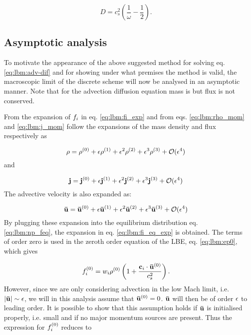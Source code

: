 \begin{equation}\label{eq:lbm:np_D}
D = c_s^2 \left( \frac{1}{\omega} - \frac{1}{2} \right).
\end{equation}

\subsection{Asymptotic analysis}\label{sec:lbm:asym_np}
To motivate the appearance of the above suggested method for solving
eq. \eqref{eq:lbm:adv-dif} and for showing under what premises the
method is valid, the macroscopic limit of the discrete scheme will now
be analysed in an asymptotic manner. Note that for the advection
diffusion equation mass is but flux is not conserved.

From the expansion of $f_i$ in eq. \eqref{eq:lbm:fi_exp} and from
eqs. \eqref{eq:lbm:rho_mom} and \eqref{eq:lbm:j_mom} follow the
expansions of the mass density and flux respectively as

\begin{equation}\label{eq:lbm:rho_exp}
\rho = \rho^{(0)} + \epsilon\rho^{(1)} + \epsilon^2\rho^{(2)} + \epsilon^3\rho^{(3)} + \mathcal{O}(\epsilon^4)
\end{equation} 
and

\begin{equation}
\mathbf{j} = \mathbf{j}^{(0)} + \epsilon\mathbf{j}^{(1)} + \epsilon^2\mathbf{j}^{(2)} + \epsilon^3\mathbf{j}^{(3)} + \mathcal{O}(\epsilon^4)
\end{equation} 
The advective velocity is also expanded as: 

\begin{equation}
\mathbf{\bar{u}} = \mathbf{\bar{u}}^{(0)} + \epsilon\mathbf{\bar{u}}^{(1)} + \epsilon^2\mathbf{\bar{u}}^{(2)} + \epsilon^3\mathbf{\bar{u}}^{(3)} + \mathcal{O}(\epsilon^4)
\end{equation}
By plugging these expansion into the equilibrium distribution
eq. \eqref{eq:lbm:np_feq}, the expansion in
eq. \eqref{eq:lbm:fi_eq_exp} is obtained. The terms of order zero is
used in the zeroth order equation of the LBE, eq. \eqref{eq:lbm:ep0},
which gives

\begin{equation}
f_i^{(0)} = w_i\rho^{(0)} \left( 1 + \frac{\mathbf{c}_i \cdot \mathbf{\bar{u}}^{(0)}}{c_s^2} \right).
\end{equation}
However, since we are only considering advection in the low Mach
limit, i.e. $|\mathbf{\bar{u}}| \sim \epsilon$, we will in this analysis assume that
$\mathbf{\bar{u}}^{(0)} = 0$. $\mathbf{\bar{u}}$ will then be of order $\epsilon$ to leading
order. It is possible to show \cite{junk-asym} that this assumption
holds if $\mathbf{\bar{u}}$ is initialised properly, i.e. small and if no major
momentum sources are present. Thus the expression for $f_i^{(0)}$
reduces to

